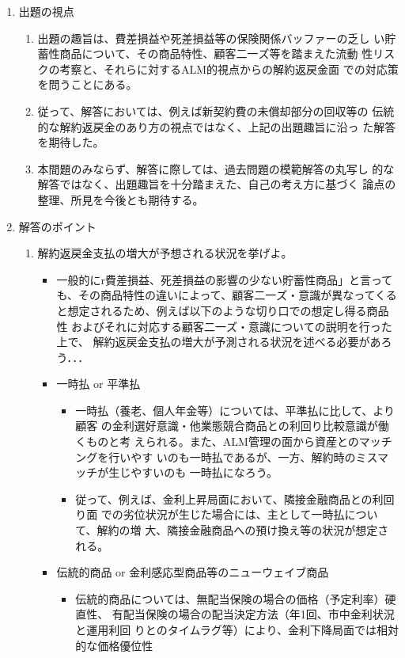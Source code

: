 \documentclass[report,gutter=10mm,fore-edge=10mm,uplatex,dvipdfmx]{jlreq}
\begin{document}
\begin{enumerate}
 \item 出題の視点
\begin{enumerate}
 \item 出題の趣旨は、費差損益や死差損益等の保険関係バッファーの乏し
い貯蓄性商品について、その商品特性、顧客二一ズ等を踏まえた流動
性リスクの考察と、それらに対するALM的視点からの解約返戻金面
での対応策を問うことにある。
 \item 従って、解答においては、例えば新契約費の未償却部分の回収等の
伝統的な解約返戻金のあり方の視点ではなく、上記の出題趣旨に沿っ
た解答を期待した。
 \item 本間題のみならず、解答に際しては、過去問題の模範解答の丸写し
的な解答ではなく、出題趣旨を十分踏まえた、自己の考え方に基づく
論点の整理、所見を今後とも期待する。
\end{enumerate}
 \item 解答のポイント
\begin{enumerate}
 \item 解約返戻金支払の増大が予想される状況を挙げよ。
\begin{itemize}
 \item 一般的にr費差損益、死差損益の影響の少ない貯蓄性商品」と言って
も、その商品特性の違いによって、顧客二一ズ・意識が異なってくる
と想定されるため、例えば以下のような切り口での想定し得る商品性
およびそれに対応する顧客二一ズ・意識についての説明を行った上で、
解約返戻金支払の増大が予測される状況を述べる必要があろう．．．
 \item 一時払 or 平準払
\begin{itemize}
 \item 一時払（養老、個人年金等）については、平準払に比して、より顧客
の金利選好意識・他業態競合商品との利回り比較意識が働くものと考
えられる。また、ALM管理の面から資産とのマッチングを行いやす
いのも一時払であるが、一方、解約時のミスマッチが生じやすいのも
一時払になろう。
 \item 従って、例えば、金利上昇局面において、隣接金融商品との利回り面
での劣位状況が生じた場合には、主として一時払について、解約の増
大、隣接金融商品への預け換え等の状況が想定される。
\end{itemize}
 \item 伝統的商品 or 金利感応型商品等のニューウェイブ商品
\begin{itemize}
 \item 伝統的商品については、無配当保険の場合の価格（予定利率）硬直性、
有配当保険の場合の配当決定方法（年1回、市中金利状況と運用利回
りとのタイムラグ等）により、金利下降局面では相対的な価格優位性

\end{itemize}
\end{itemize}
\end{enumerate}
\end{enumerate}
\end{document}

